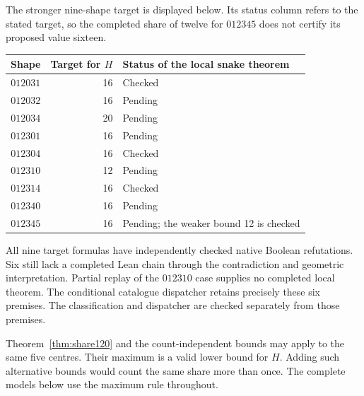 The stronger nine-shape target is displayed below. Its status column refers to the stated target, so the completed share of twelve for $012345$ does not certify its proposed value sixteen.
\begin{center}\small
\begin{tabular}{c r l}
\toprule
Shape & Target for $H$ & Status of the local snake theorem\\\midrule
$012031$ & 16 & Checked\\
$012032$ & 16 & Pending\\
$012034$ & 20 & Pending\\
$012301$ & 16 & Pending\\
$012304$ & 16 & Checked\\
$012310$ & 12 & Pending\\
$012314$ & 16 & Checked\\
$012340$ & 16 & Pending\\
$012345$ & 16 & Pending; the weaker bound 12 is checked\\
\bottomrule
\end{tabular}
\end{center}
All nine target formulas have independently checked native Boolean refutations. Six still lack a completed Lean chain through the contradiction and geometric interpretation. Partial replay of the $012310$ case supplies no completed local theorem. The conditional catalogue dispatcher retains precisely these six premises. The classification and dispatcher are checked separately from those premises.

Theorem~\ref{thm:share120} and the count-independent bounds may apply to the same five centres. Their maximum is a valid lower bound for $H$. Adding such alternative bounds would count the same share more than once. The complete models below use the maximum rule throughout.
